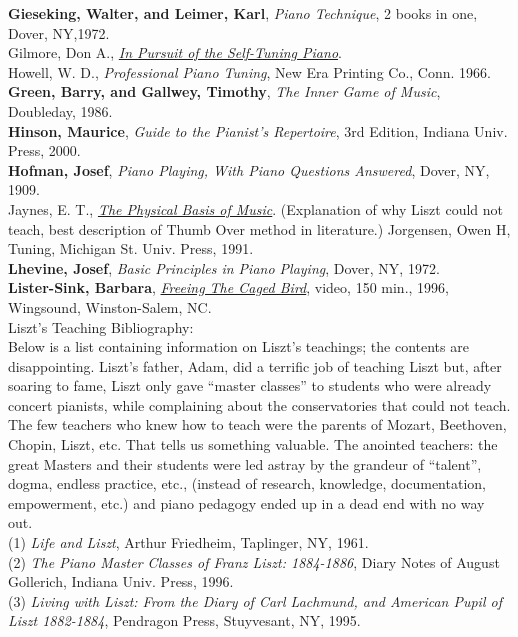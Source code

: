 \textbf{Gieseking, Walter, and Leimer, Karl}, \textit{Piano Technique}, 2 books in one, Dover, NY,1972.\\
Gilmore, Don A., \href{http://home.kc.rr.com/eromlignod/}{\textit{In Pursuit of the Self-Tuning Piano}}.\\
Howell, W. D., \textit{Professional Piano Tuning}, New Era Printing Co., Conn. 1966.\\
\textbf{Green, Barry, and Gallwey, Timothy}, \textit{The Inner Game of Music}, Doubleday, 1986.\\
\textbf{Hinson, Maurice}, \textit{Guide to the Pianist’s Repertoire}, 3rd Edition, Indiana Univ. Press, 2000.\\
\textbf{Hofman, Josef}, \textit{Piano Playing, With Piano Questions Answered}, Dover, NY, 1909.\\
Jaynes, E. T., \href{http://bayes.wustl.edu/etj/music.html}{\textit{The Physical Basis of Music}}. (Explanation of why Liszt could not teach, best description of Thumb Over method in literature.) Jorgensen, Owen H, Tuning, Michigan St. Univ. Press, 1991.\\
\textbf{Lhevine, Josef}, \textit{Basic Principles in Piano Playing}, Dover, NY, 1972.\\
\textbf{Lister-Sink, Barbara}, \href{http://www.freeingthecagedbird.com/}{\textit{Freeing The Caged Bird}}, video, 150 min., 1996, Wingsound, Winston-Salem, NC.\\
Liszt’s Teaching Bibliography:\\
Below is a list containing information on Liszt’s teachings; the contents are disappointing. Liszt’s father, Adam, did a terrific job of teaching Liszt but, after soaring to fame, Liszt only gave “master classes” to students who were already concert pianists, while complaining about the conservatories that could not teach. The few teachers who knew how to teach were the parents of Mozart, Beethoven, Chopin, Liszt, etc. That tells us something valuable. The anointed teachers: the great Masters and their students were led astray by the grandeur of “talent”, dogma, endless practice, etc., (instead of research, knowledge, documentation, empowerment, etc.) and piano pedagogy ended up in a dead end with no way out.\\
(1) \textit{Life and Liszt}, Arthur Friedheim, Taplinger, NY, 1961.\\
(2) \textit{The Piano Master Classes of Franz Liszt: 1884-1886}, Diary Notes of August Gollerich, Indiana Univ. Press, 1996.\\
(3) \textit{Living with Liszt: From the Diary of Carl Lachmund, and American Pupil of Liszt 1882-1884}, Pendragon Press, Stuyvesant, NY, 1995.\\
